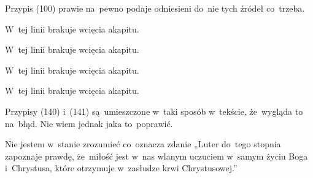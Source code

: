 \documentclass[a4paper,11pt]{article}
\begin{document}
\vspace{\spaceFour}


\start {} Przypis (100) prawie na~pewno podaje odniesieni
do~nie tych źródeł co~trzeba.

\vspace{\spaceFour}


\start {} W~tej linii brakuje wcięcia akapitu.

\vspace{\spaceFour}


\start {} W~tej linii brakuje wcięcia akapitu.

\vspace{\spaceFour}


\start {} W~tej linii brakuje wcięcia akapitu.

\vspace{\spaceFour}


\start {} W~tej linii brakuje wcięcia akapitu.

\vspace{\spaceFour}


\start {} Przypisy (140) i~(141) są~umieszczone w~taki sposób
w~tekście, że~wygląda to na~błąd. Nie wiem jednak jaka to~poprawić.

\vspace{\spaceFour}


\start {} Nie jestem w~stanie zrozumieć co~oznacza zdanie
„Luter do~tego stopnia zapoznaje prawdę, że~miłość jest w~nas wlanym
uczuciem w~samym życiu Boga i~Chrystusa, które otrzymuje w~zasłudze
krwi Chrystusowej.”

\vspace{\spaceFour}




\end{document}
